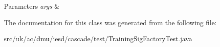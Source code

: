 \begin{DoxyParams}{Parameters}
{\em args} & \\
\hline
\end{DoxyParams}


The documentation for this class was generated from the following file\-:\begin{DoxyCompactItemize}
\item 
src/uk/ac/dmu/iesd/cascade/test/Training\-Sig\-Factory\-Test.\-java\end{DoxyCompactItemize}
